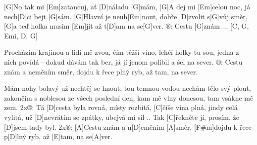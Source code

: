 
[G]No tak mi [Em]zatancuj, ať [D]náladu [G]mám,
[G]A dej mi [Em]celou noc, já nech[D]ci bejt [G]sám.
[G]Hlavní je neuh[Em]nout, dobře [D]zvolit s[G]vůj směr, 
[G]a teď holka musim [Em]jít až t[D]am na se[G]ver.
®: Cestu [G]znám ... [C, G, Emi, D, G]

Procházím krajinou a lidi mě zvou,
čím těžší víno, lehčí holky tu sou,
jedna z nich povídá - dokud dávám tak ber,
já jí jenom políbil a šel na sever.
®: Cestu znám a neměním směr, 
dojdu k řece plný ryb, až tam, na sever.

Mám nohy bolavý už nechtěj se hnout,
tou temnou vodou nechám tělo svý plout,
zakončím s noblesou ze všech poslední den,
kam mě vlny donesou, tam vsákne mě zem.
2x®:
Tá [D]cesta byla rovná, místy rozbitá,
[C]\null číše vína plná, jindy celá vylitá,
už [D]nevrátím se zpátky, ubejvá mi sil ..
Tak [C]\null řekněte jí, prosím, že [D]jsem tady byl.
2x®:
[A]Cestu znám a n[D]eměním [A]směr, 
[F#m]dojdu k řece p[D]lný ryb, až [E]tam, na se[A]ver.